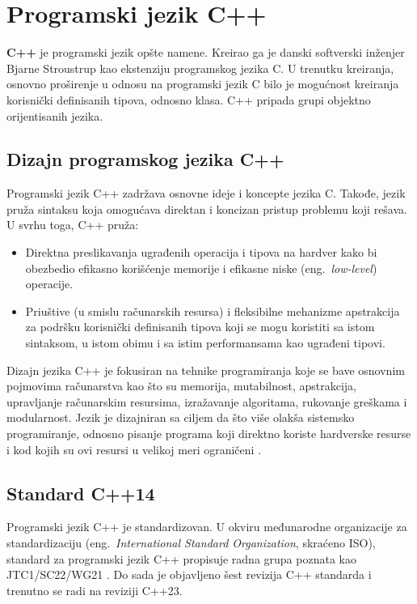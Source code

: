 \documentclass[12pt,oneside]{memoir}
\begin{document}
\section{Programski jezik C++}

\textbf{C++} je programski jezik op\v{s}te namene. Kreirao ga je danski softverski in\v{z}enjer Bjarne Stroustrup kao ekstenziju programskog jezika C. U trenutku kreiranja, osnovno pro\v{s}irenje u odnosu na programski jezik C bilo je mogu\'{c}nost kreiranja korisni\v{c}ki definisanih tipova, odnosno klasa. C++ pripada grupi objektno orijentisanih jezika. 

\subsection{Dizajn programskog jezika C++}

Programski jezik C++ zadr\v{z}ava osnovne ideje i koncepte jezika C. Takođe, jezik pru\v{z}a sintaksu koja omogu\'{c}ava direktan i koncizan pristup problemu koji re\v{s}ava.
U svrhu toga, C++ pru\v{z}a:
\begin{itemize}
  \item {Direktna preslikavanja ugrađenih operacija i tipova na hardver kako bi obezbedio efikasno kori\v{s}\'{c}enje memorije i efikasne niske (eng.~\textit{low-level}) operacije.}
  \item {Priu\v{s}tive (u smislu ra\v{c}unarskih resursa) i fleksibilne mehanizme apstrakcija za podr\v{s}ku korisni\v{c}ki definisanih tipova koji se mogu koristiti sa istom sintaksom, u istom obimu i sa istim performansama kao ugrađeni tipovi.}
\end{itemize}

Dizajn jezika C++ je fokusiran na tehnike programiranja koje se bave osnovnim pojmovima ra\v{c}unarstva kao \v{s}to su memorija, mutabilnost, apstrakcija, upravljanje ra\v{c}unarskim resursima, izra\v{z}avanje algoritama, rukovanje gre\v{s}kama i modularnost. Jezik je dizajniran sa ciljem da \v{s}to vi\v{s}e olak\v{s}a sistemsko programiranje, odnosno pisanje programa koji direktno koriste hardverske resurse i kod kojih su ovi resursi u velikoj meri ograni\v{c}eni \cite{TheC++ProgrammingLanguage}.


\subsection{Standard C++14}

Programski jezik C++ je standardizovan. U okviru međunarodne organizacije za standardizaciju (eng.~\textit{International Standard Organization}, skra\'{c}eno ISO), standard za programski jezik C++ propisuje radna grupa poznata kao JTC1/SC22/WG21 \cite{ISOWebsite}. Do sada je objavljeno \v{s}est revizija C++ standarda i trenutno se radi na reviziji C++23. 
\indent
\end{document}
